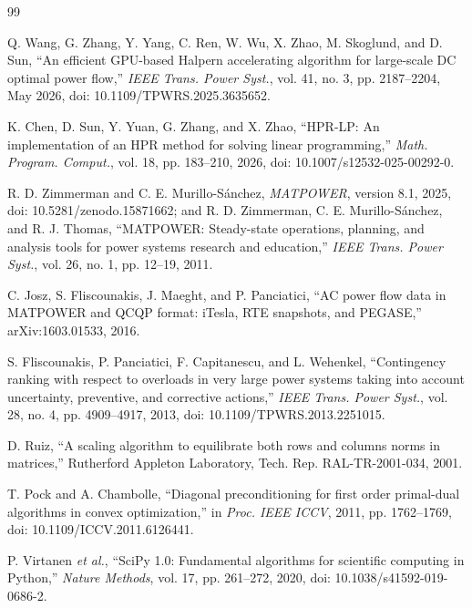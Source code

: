 \documentclass[10pt,journal]{IEEEtran}
\begin{document}
\begin{thebibliography}{99}

Q. Wang, G. Zhang, Y. Yang, C. Ren, W. Wu, X. Zhao, M. Skoglund, and D. Sun,
\textquotedblleft{}An efficient GPU-based Halpern accelerating algorithm for large-scale DC
optimal power flow,\textquotedblright{} \emph{IEEE Trans. Power Syst.}, vol. 41, no. 3,
pp. 2187--2204, May 2026, doi: 10.1109/TPWRS.2025.3635652.

K. Chen, D. Sun, Y. Yuan, G. Zhang, and X. Zhao,
\textquotedblleft{}HPR-LP: An implementation of an HPR method for solving linear programming,\textquotedblright{}
\emph{Math. Program. Comput.}, vol. 18, pp. 183--210, 2026,
doi: 10.1007/s12532-025-00292-0.

R. D. Zimmerman and C. E. Murillo-S\'anchez, \emph{MATPOWER}, version 8.1,
2025, doi: 10.5281/zenodo.15871662; and R. D. Zimmerman,
C. E. Murillo-S\'anchez, and R. J. Thomas, \textquotedblleft{}MATPOWER: Steady-state
operations, planning, and analysis tools for power systems research and
education,\textquotedblright{} \emph{IEEE Trans. Power Syst.}, vol. 26, no. 1, pp. 12--19,
2011.

C. Josz, S. Fliscounakis, J. Maeght, and P. Panciatici,
\textquotedblleft{}AC power flow data in MATPOWER and QCQP format: iTesla, RTE snapshots, and
PEGASE,\textquotedblright{} arXiv:1603.01533, 2016.

S. Fliscounakis, P. Panciatici, F. Capitanescu, and L. Wehenkel,
\textquotedblleft{}Contingency ranking with respect to overloads in very large power systems
taking into account uncertainty, preventive, and corrective actions,\textquotedblright{}
\emph{IEEE Trans. Power Syst.}, vol. 28, no. 4, pp. 4909--4917, 2013,
doi: 10.1109/TPWRS.2013.2251015.

D. Ruiz, \textquotedblleft{}A scaling algorithm to equilibrate both rows and columns norms in
matrices,\textquotedblright{} Rutherford Appleton Laboratory, Tech. Rep. RAL-TR-2001-034, 2001.

\newpage
{}
T. Pock and A. Chambolle, \textquotedblleft{}Diagonal preconditioning for first order
primal-dual algorithms in convex optimization,\textquotedblright{} in \emph{Proc. IEEE ICCV},
2011, pp. 1762--1769, doi: 10.1109/ICCV.2011.6126441.

P. Virtanen \emph{et al.}, \textquotedblleft{}SciPy 1.0: Fundamental algorithms for
scientific computing in Python,\textquotedblright{} \emph{Nature Methods}, vol. 17,
pp. 261--272, 2020, doi: 10.1038/s41592-019-0686-2.


\end{thebibliography}
\end{document}

